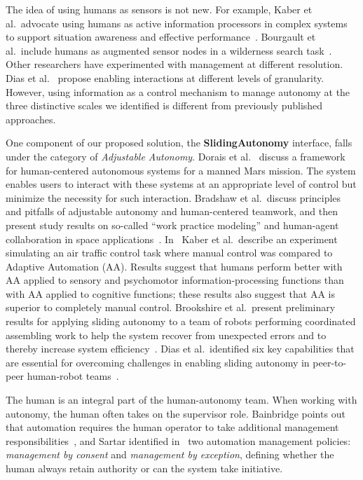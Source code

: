 The idea of using humans as sensors is not new. For example, Kaber et al.\ advocate using humans as active information processors in complex systems to support situation awareness and effective performance~\cite{Kaber2001Design}. Bourgault et al.\ include humans as augmented sensor nodes in a wilderness search task~\cite{Bourgault2008AugmentedNodes}. Other researchers have experimented with management at different resolution. Dias et al.\ \cite{Dias2008SlidingAutonomy} propose enabling interactions at different levels of granularity. However, using information as a control mechanism to manage autonomy at the three distinctive scales we identified is different from previously published approaches.

One component of our proposed solution, the \textbf{SlidingAutonomy} interface, falls under the category of \textit{Adjustable Autonomy}. Dorais et al.\ \cite{Dorais1998AdjustableAutonomy} discuss a framework for human-centered autonomous systems for a manned Mars mission. The system enables users to interact with these systems at an appropriate level of control but minimize the necessity for such interaction. Bradshaw et al.\ discuss principles and pitfalls of adjustable autonomy and human-centered teamwork, and then present study results on so-called ``work practice modeling'' and human-agent collaboration in space applications~\cite{Bradshaw2003AdjustableAutonomy}. In~\cite{Kaber2005Adaptive} Kaber et al.\ describe an experiment simulating an air traffic control task where manual control was compared to Adaptive Automation (AA). Results suggest that humans perform better with AA applied to sensory and psychomotor information-processing functions than with AA applied to cognitive functions; these results also suggest that AA is superior to completely manual control. Brookshire et al.\ present preliminary results for applying sliding autonomy to a team of robots performing coordinated assembling work to help the system recover from unexpected errors and to thereby increase system efficiency~\cite{Brookshire2004Preliminary}. Dias et al.\ identified six key capabilities that are essential for overcoming challenges in enabling sliding autonomy in peer-to-peer human-robot teams~\cite{Dias2008SlidingAutonomy}.

The human is an integral part of the human-autonomy team. When working with autonomy, the human often takes on the supervisor role. Bainbridge points out that automation requires the human operator to take additional management responsibilities~\cite{Bainbridge1983Ironies}, and Sartar identified in~\cite{Sarter1998Making} two automation management policies: \textit{management by consent} and \textit{management by exception}, defining whether the human always retain authority or can the system take initiative. 

